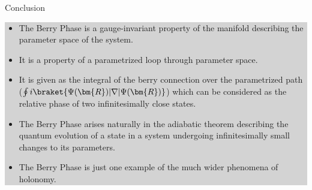 \documentclass[9pt]{beamer}
\begin{document}
\begin{frame}{Conclusion}
  
  \centering
  \colorbox{lightgray}
  {
    \begin{minipage}{0.8\textwidth}
    \begin{itemize}
      \item The Berry Phase is a gauge-invariant property of the manifold describing
            the parameter space of the system.
      \item It is a property of a parametrized loop through parameter space.
      \item It is given as the integral of the berry connection over the parametrized
        path ($\oint i \braket{\Psi(\bm{R})|\nabla|\Psi(\bm{R})}$) which can be
        considered as the relative phase of two infinitesimally close states.
      \item The Berry Phase arises naturally in the adiabatic theorem describing the
            quantum evolution of a state in a system undergoing infinitesimally small changes
            to its parameters.
      \item The Berry Phase is just one example of the much wider phenomena of holonomy.
    \end{itemize}
  \end{minipage}
  }

\end{frame}
\end{document}
